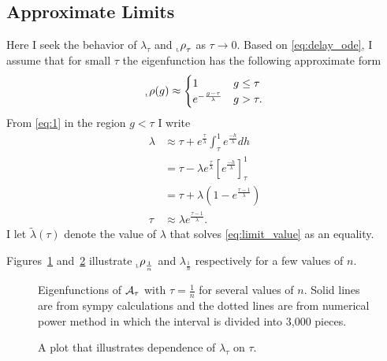 \documentclass[12pt]{article} \usepackage{amsmath,amsfonts}
\newcommand{\Aop}{{\cal A}}
\newcommand{\leftfunction}{{_{_{\scalebox{.4}{L}}} \rho}}
\begin{document}
\subsection{Approximate Limits}
\label{sec:limits}

Here I seek the behavior of $\lambda_\tau$ and $\leftfunction_\tau$ as
$\tau \rightarrow 0$.  Based on \eqref{eq:delay_ode}, I assume that
for small $\tau$ the eigenfunction has the following approximate form
\begin{equation}
  \label{eq:limit_function}
  \leftfunction(g) \approx
  \begin{cases}
    1 & g \leq \tau \\
    e^{- \frac{g - \tau}{\lambda}} & g > \tau .
  \end{cases}
\end{equation}
From \eqref{eq:1} in the region $g<\tau$ I write
\begin{align}
  \lambda &\approx \tau + e^{\frac{\tau}{\lambda}} \int_\tau^1
  e^{\frac{-h}{\lambda}} dh \nonumber  \\
  &= \tau - \lambda e^{\frac{\tau}{\lambda}} \left[
    e^{\frac{-h}{\lambda}} \right]_\tau^1\nonumber  \\
  &= \tau + \lambda \left( 1 - e^{\frac{\tau -1 }{\lambda}} \right)
    \nonumber \\
  \label{eq:limit_value}
  \tau & \approx \lambda e^{\frac{\tau - 1}{\lambda}}.
\end{align}
I let $\tilde \lambda(\tau)$ denote the value of $\lambda$ that solves
\eqref{eq:limit_value} as an equality.

Figures~\ref{fig:eigenfunctions} and~\ref{fig:eigenvalues} illustrate
$\leftfunction_{\frac{1}{n}}$ and $\lambda_{\frac{1}{n}}$ respectively
for a few values of $n$.

\begin{figure*}
  \centering
  \caption{Eigenfunctions of $\Aop_\tau$ with $\tau=\frac{1}{n}$ for
    several values of $n$.  Solid lines are from sympy calculations
    and the dotted lines are from numerical power method in which the
    interval is divided into 3,000 pieces.}
  \label{fig:eigenfunctions}
\end{figure*}

\begin{figure*}
  \centering
  \caption{A plot that illustrates dependence of $\lambda_{\tau}$ on
    $\tau$.}
  \label{fig:eigenvalues}
\end{figure*}
\end{document}
